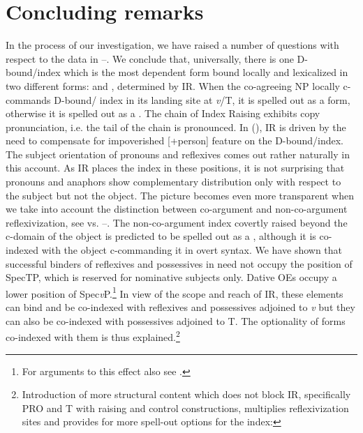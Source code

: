 \documentclass[output=paper,nonflat,colorlinks,citecolor=brown,newtxmath]{langsci/langscibook}
\begin{document}
\section{Concluding remarks}\label{sec:witkos:s4}
\largerpage
In the process of our investigation, we have raised a number of questions with respect to the data in --. We conclude that, universally, there is one D-bound/index which is the most dependent form bound locally and lexicalized in two different forms:  and , determined by IR. When the co-agreeing NP locally c-commands D-bound/ index in its landing site at \textit{v}/T, it is spelled out as a  form, otherwise it is spelled out as a . The chain of Index Raising exhibits copy pronunciation, i.e. the tail of the chain is pronounced. In  (), IR is driven by the need to compensate for impoverished [+person] feature on the D-bound/index. The subject orientation of  pronouns and  reflexives comes out rather naturally in this account. As IR places the index in these positions, it is not surprising that pronouns and anaphors show complementary distribution only with respect to the subject but not the object. The picture becomes even more transparent when we take into account the distinction between co-argument and non-co-argument reflexivization, see  vs. --. The non-co-argument index covertly raised beyond the c-domain of the object is predicted to be spelled out as a  , although it is co-indexed with the object c-commanding it in overt syntax. We have shown that successful binders of reflexives and  possessives in  need not occupy the position of SpecTP, which is reserved for nominative subjects only. Dative OEs occupy a lower position of Spec\textit{v}P.\footnote{\label{fn36}For arguments to this effect also see \cite{citkoetal2018}.} In view of the scope and reach of IR, these elements can bind and be co-indexed with reflexives and  possessives adjoined to \textit{v} but they can also be co-indexed with  possessives adjoined to T. The optionality of  forms co-indexed with them is thus explained.\footnote{\label{fn37}Introduction of more structural content which does not block IR, specifically PRO and  T with raising and control constructions, multiplies reflexivization sites and provides for more spell-out options for the index:

}
\end{document}
